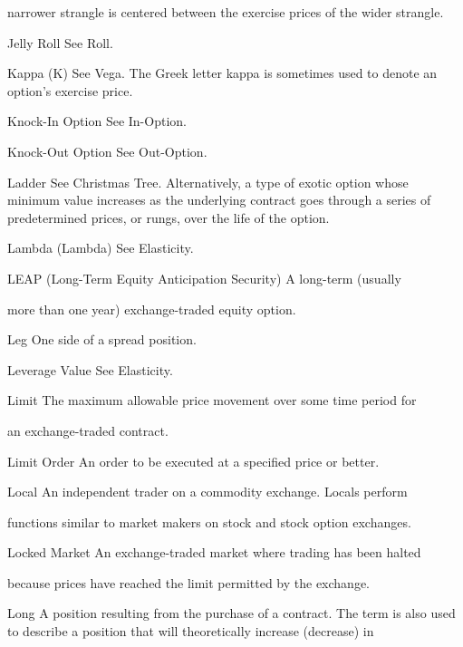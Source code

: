 narrower strangle is centered between the exercise prices of the wider strangle.\par
Jelly Roll See Roll.\par
Kappa (K) See Vega. The Greek letter kappa is sometimes used to denote an option's exercise price.\par
Knock-In Option See In-Option.\par
Knock-Out Option See Out-Option.\par
Ladder See Christmas Tree. Alternatively, a type of exotic option whose minimum value increases as the underlying contract goes through a series of predetermined prices, or rungs, over the life of the option.\par
Lambda (Lambda) See Elasticity.\par
LEAP (Long-Term Equity Anticipation Security) A long-term (usually\par
more than one year) exchange-traded equity option.\par
Leg One side of a spread position.\par
Leverage Value See Elasticity.\par
Limit The maximum allowable price movement over some time period for\par
an exchange-traded contract.\par
Limit Order An order to be executed at a specified price or better.\par
Local An independent trader on a commodity exchange. Locals perform\par
functions similar to market makers on stock and stock option exchanges.\par
Locked Market An exchange-traded market where trading has been halted\par
because prices have reached the limit permitted by the exchange.\par
Long A position resulting from the purchase of a contract. The term is also used to describe a position that will theoretically increase (decrease) in\par

